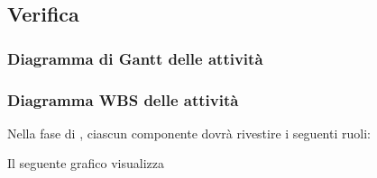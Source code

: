 \subsection{Verifica}


\subsubsection{Diagramma di Gantt delle attività}


\subsubsection{Diagramma WBS delle attività}




Nella fase di , ciascun componente dovrà rivestire i seguenti ruoli:

Il seguente grafico visualizza 
